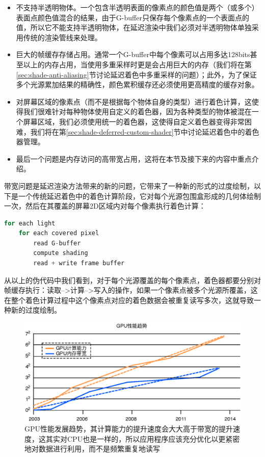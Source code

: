 \begin{itemize}
	\item 不支持半透明物体。一个包含半透明表面的像素点的颜色值是两个（或多个）表面点颜色值混合的结果，由于G-buffer只保存每个像素点的一个表面点的值，所以它不能支持半透明物体，在延迟渲染中我们必须对半透明物体单独采用传统的渲染管线来处理。
	\item 巨大的帧缓存存储占用。通常一个G-buffer中每个像素可以占用多达128bits甚至以上的内存占用，当使用多重采样时更是会占用巨大的内存（我们将在第\ref{sec:shade-anti-aliasing}节讨论延迟着色中多重采样的问题）；此外，为了保证多个光源累加结果的精确性，颜色累积缓存还必须使用更高精度的缓存对象。
	\item 对屏幕区域的像素点（而不是根据每个物体自身的类型）进行着色计算，这使得我们很难针对每种物体使用自定义的着色器，因为各种类型的物体被混在一个屏幕区域，我们必须使用统一的着色器，这使得自定义着色器变得非常困难，我们将在第\ref{sec:shade-deferred-custom-shader}节中讨论延迟着色中的着色器管理。
	\item 最后一个问题是内存访问的高带宽占用，这将在本节及接下来的内容中重点介绍。
\end{itemize}

带宽问题是延迟渲染方法带来的新的问题，它带来了一种新的形式的过度绘制，以下是一个传统延迟着色中的着色计算阶段，它对每个光源包围盒形成的几何体绘制一次，然后在其覆盖的屏幕2D区域内对每个像素执行着色计算：

\begin{lstlisting}[language=C++]
for each light
	for each covered pixel
		read G-buffer
		compute shading
		read + write frame buffer
\end{lstlisting}

从以上的伪代码中我们看到，对于每个光源覆盖的每个像素点，着色器都要分别对帧缓存执行：读取-->计算-->写入的操作，如果一个像素点被多个光源所覆盖，这在整个着色计算过程中这个像素点对应的着色数据会被重复读写多次，这就导致一种新的过度绘制。

\begin{figure}
	\includegraphics[width=1.\textwidth]{figures/shade/gpu-trends}
	\caption{GPU性能发展趋势，其计算能力的提升速度会大大高于带宽的提升速度，这其实对CPU也是一样的，所以应用程序应该充分优化以更紧密地对数据进行利用，而不是频繁重复地读写}
	\label{f:shade-gpu-trends}
\end{figure}

